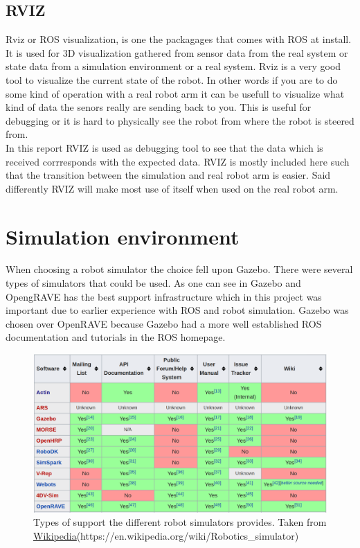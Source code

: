 \subsection{RVIZ}
Rviz or ROS visualization, is one the packagages that comes with ROS at install. It is used for 3D visualization gathered from sensor data from the real system or state data from a simulation environment or a real system. Rviz is a very good tool to visualize the current state of the robot. In other words if you are to do some kind of operation with a real robot arm it can be usefull to visualize what kind of data the senors really are sending back to you. This is useful for debugging or it is hard to physically see the robot from where the robot is steered from.\\
In this report RVIZ is used as debugging tool to see that the data which is received corrresponds with the expected data. RVIZ is mostly included here such that the transition between the simulation and real robot arm is easier. Said differently RVIZ will make most use of itself when used on the real robot arm. 

\section{Simulation environment}
When choosing a robot simulator the choice fell upon Gazebo. There were several types of simulators that could be used. As one can see in  Gazebo and OpengRAVE has the best support infrastructure which in this project was important due to earlier experience with ROS and robot simulation. Gazebo was chosen over OpenRAVE because Gazebo had a more well established ROS documentation and tutorials in the ROS homepage. \\




\begin{figure}[htbp]
  \centering
  \includegraphics[width=.9\textwidth]{img/WikipTableRobSim.png}
  \caption{Types of support the different robot simulators provides. Taken from \href{https://en.wikipedia.org/wiki/Robotics_simulator}{\underline{Wikipedia}}(https://en.wikipedia.org/wiki/Robotics\_simulator)}
  \label{fig:infra}
\end{figure}

